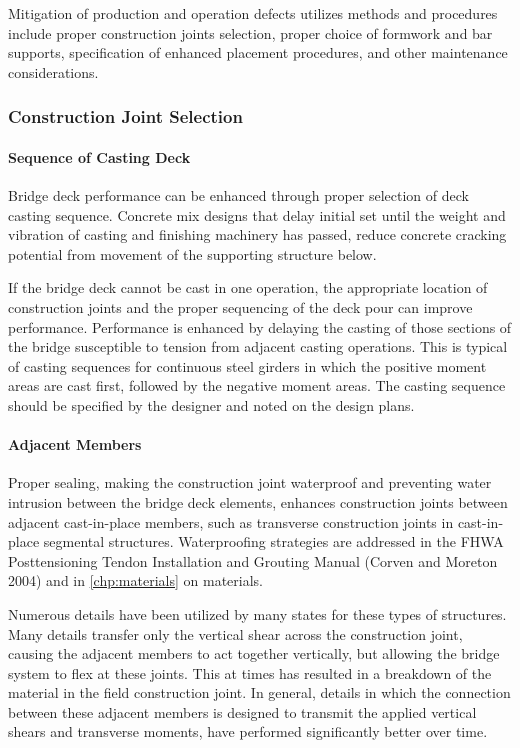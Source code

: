 Mitigation of production and operation defects utilizes methods and procedures include proper construction joints selection, proper choice of formwork and bar supports, specification of enhanced placement procedures, and other maintenance considerations.

\subsubsection{Construction Joint Selection}
\paragraph{Sequence of Casting Deck}
Bridge deck performance can be enhanced through proper selection of deck casting sequence. Concrete mix designs that delay initial set until the weight and vibration of casting and finishing machinery has passed, reduce concrete cracking potential from movement of the supporting structure below.

If the bridge deck cannot be cast in one operation, the appropriate location of construction joints and the proper sequencing of the deck pour can improve performance. Performance is enhanced by delaying the casting of those sections of the bridge susceptible to tension from adjacent casting operations. This is typical of casting sequences for continuous steel girders in which the positive moment areas are cast first, followed by the negative moment areas.  The casting sequence should be specified by the designer and noted on the design plans.

\paragraph{Adjacent Members}
Proper sealing, making the construction joint waterproof and preventing water intrusion between the bridge deck elements, enhances construction joints between adjacent cast-in-place members, such as transverse construction joints in cast-in-place segmental structures. Waterproofing strategies are addressed in the FHWA Posttensioning Tendon Installation and Grouting Manual (Corven and Moreton 2004) and in \cref{chp:materials} on materials.

Numerous details have been utilized by many states for these types of structures. Many details transfer only the vertical shear across the construction joint, causing the adjacent members to act together vertically, but allowing the bridge system to flex at these joints. This at times has resulted in a breakdown of the material in the field construction joint. In general, details in which the connection between these adjacent members is designed to transmit the applied vertical shears and transverse moments, have performed significantly better over time.

